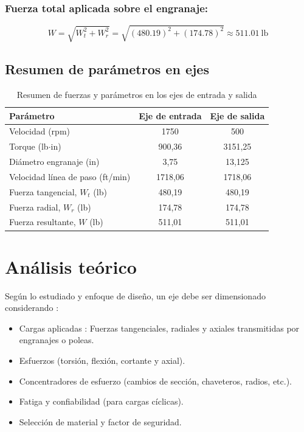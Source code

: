 \documentclass[12pt]{article}
\begin{document}
\vspace{0.2cm}

\noindent
\subsubsection{Fuerza total aplicada sobre el engranaje:}
\begin{equation}
W = \sqrt{W_t^2 + W_r^2} = \sqrt{(480.19)^2 + (174.78)^2} \approx 511.01\ \text{lb}
\end{equation}

\vspace{0.3cm}

\noindent

\subsection{Resumen de parámetros en ejes}
\begin{table}[H]
\centering
\caption{Resumen de fuerzas y parámetros en los ejes de entrada y salida}
\label{tab:resumen2}
\begin{tabular}{lcc}
\toprule
\textbf{Parámetro} & \textbf{Eje de entrada} & \textbf{Eje de salida} \\
\midrule
Velocidad (rpm) & 1750 & 500 \\
Torque (lb$\cdot$in) & 900,36 & 3151,25
 \\
Diámetro engranaje (in) & 3,75 & 13,125 \\
Velocidad línea de paso (ft/min) & 1718,06 & 1718,06 \\
Fuerza tangencial, $W_t$ (lb) & 480,19 & 480,19 \\
Fuerza radial, $W_r$ (lb) & 174,78 & 174,78 \\
Fuerza resultante, $W$ (lb) & 511,01 & 511,01 \\
\bottomrule
\end{tabular}
\end{table}


\section{Análisis teórico}
Según lo estudiado y enfoque de diseño, un eje debe ser dimensionado considerando \parencite[]{budynas2012diseño}:
 \begin{itemize}
     \item Cargas aplicadas : Fuerzas tangenciales, radiales y axiales transmitidas por engranajes o poleas.
     \item Esfuerzos (torsión, flexión, cortante y axial).
     \item Concentradores de esfuerzo (cambios de sección, chaveteros, radios, etc.).
     \item Fatiga y confiabilidad (para cargas cíclicas).
     \item Selección de material y factor de seguridad.
 \end{itemize}
\end{document}
